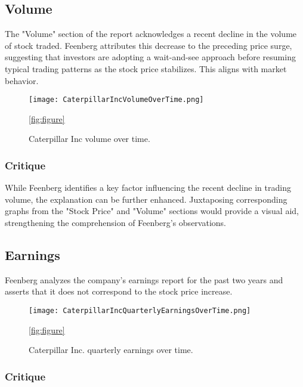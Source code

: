 \documentclass[9pt,a4paper,twoside]{tau}
\begin{document}
    \subsection{Volume}

        The "Volume" section of the report acknowledges a recent decline in the volume of stock traded. Feenberg attributes this decrease to the preceding price surge, suggesting that investors are adopting a wait-and-see approach before resuming typical trading patterns as the stock price stabilizes. This aligns with market behavior.
 
            \begin{figure}[H]
                \centering
                \texttt{[image: CaterpillarIncVolumeOverTime.png]}
                \caption{Caterpillar Inc volume over time\cite{feenberg-2024}.}
                \ref{fig:figure}
            \end{figure}

            \subsubsection{Critique}

            While Feenberg identifies a key factor influencing the recent decline in trading volume, the explanation can be further enhanced. Juxtaposing corresponding graphs from the "Stock Price" and "Volume" sections would provide a visual aid, strengthening the comprehension of Feenberg's observations.

    \subsection{Earnings}    

        Feenberg analyzes the company's earnings report for the past two years and asserts that it does not correspond to the stock price increase.
        
            \begin{figure}[H]
                \centering
                \texttt{[image: CaterpillarIncQuarterlyEarningsOverTime.png]}
                \caption{Caterpillar Inc. quarterly earnings over time\cite{feenberg-2024}.} 
                \ref{fig:figure}
            \end{figure}

            \subsubsection{Critique}
\end{document}
